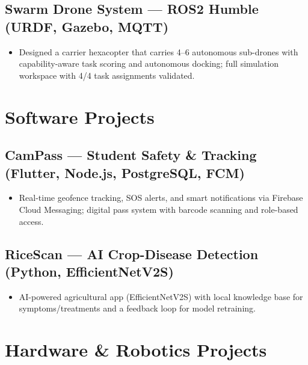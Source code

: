 \documentclass[10pt]{article}
\newif\ifinclhardware \inclhardwaretrue
\newif\ifmllead \mlleadfalse
\begin{document}
\subsection{Swarm Drone System --- ROS2 Humble \hfill (URDF, Gazebo, MQTT)}
\begin{itemize}
  \item Designed a carrier hexacopter that carries 4--6 autonomous sub-drones with capability-aware task scoring and autonomous docking; full simulation workspace with 4/4 task assignments validated.
\end{itemize}
\fi

\section{Software Projects}

\subsection{CamPass --- Student Safety \& Tracking \hfill (Flutter, Node.js, PostgreSQL, FCM)}
\begin{itemize}
  \item Real-time geofence tracking, SOS alerts, and smart notifications via Firebase Cloud Messaging; digital pass system with barcode scanning and role-based access.
\end{itemize}

\ifmllead\relax\else
\subsection{RiceScan --- AI Crop-Disease Detection \hfill (Python, EfficientNetV2S)}
\begin{itemize}
  \item AI-powered agricultural app (EfficientNetV2S) with local knowledge base for symptoms/treatments and a feedback loop for model retraining.
\end{itemize}
\fi

\ifinclhardware
\section{Hardware \& Robotics Projects}

\ifmllead
\end{document}
